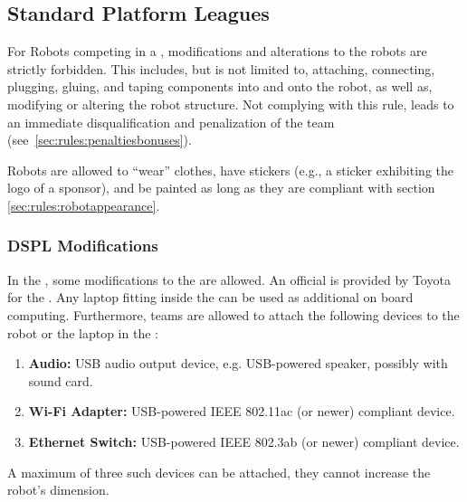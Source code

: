 \subsection{Standard Platform Leagues}
\label{sec:rules:robotappearance_spl}
For Robots competing in a \SPL{}, modifications and alterations to the robots are strictly forbidden. This includes, but is not limited to, attaching, connecting, plugging, gluing, and taping components into and onto the robot, as well as, modifying or altering the robot structure. Not complying with this rule, leads to an immediate disqualification and penalization of the team (see~\ref{sec:rules:penaltiesbonuses}).

Robots are allowed to \enquote{wear} clothes, have stickers (e.g., a sticker exhibiting the logo of a sponsor), and be painted as long as they are compliant with section \ref{sec:rules:robotappearance}.

\subsubsection{DSPL Modifications}
\label{sec:rules:mountingbracket}
In the \DSPL{}, some modifications to the \HSR{} are allowed. An official \MountingBracket{} is provided by Toyota for the \HSR{}. Any laptop fitting inside the \MountingBracket{} can be used as additional on board computing. Furthermore, teams are allowed to attach the following devices to the robot or the laptop in the \MountingBracket{}:
\begin{enumerate}
	\item \textbf{Audio:} USB audio output device, e.g. USB-powered speaker, possibly with sound card.
	\item \textbf{Wi-Fi Adapter:} USB-powered IEEE 802.11ac (or newer) compliant device.
	\item \textbf{Ethernet Switch:} USB-powered IEEE 802.3ab (or newer) compliant device.
\end{enumerate}

\noindent A maximum of three such devices can be attached, they cannot increase the robot's dimension.